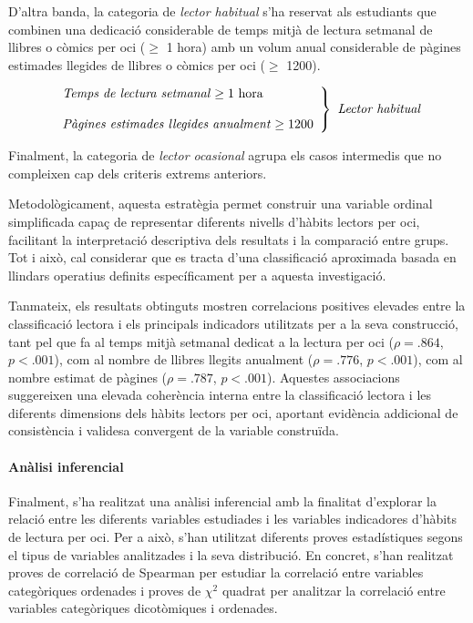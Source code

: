 \documentclass[12pt]{article}
\begin{document}
D'altra banda, la categoria de \emph{lector habitual} s’ha reservat als estudiants que combinen una dedicació considerable de temps mitjà de lectura setmanal de llibres o còmics per oci ($\geq$ 1 hora) amb un volum anual considerable de pàgines estimades llegides de llibres o còmics per oci ($\geq$ 1200).

\[
\left.
\begin{array}{l}
\text{\emph{Temps de lectura setmanal}} \geq 1 \text{ hora} \\\\
\text{\emph{Pàgines estimades llegides anualment}} \geq 1200
\end{array}
\right\}
\textit{ Lector habitual}
\]

Finalment, la categoria de \emph{lector ocasional} agrupa els casos intermedis que no compleixen cap dels criteris extrems anteriors.

Metodològicament, aquesta estratègia permet construir una variable ordinal simplificada capaç de representar diferents nivells d’hàbits lectors per oci, facilitant la interpretació descriptiva dels resultats i la comparació entre grups. Tot i això, cal considerar que es tracta d’una classificació aproximada basada en llindars operatius definits específicament per a aquesta investigació.

Tanmateix, els resultats obtinguts mostren correlacions positives elevades entre la classificació lectora i els principals indicadors utilitzats per a la seva construcció, tant pel que fa al temps mitjà setmanal dedicat a la lectura per oci ($\rho = .864$, $p < .001$), com al nombre de llibres llegits anualment ($\rho = .776$, $p < .001$), com al nombre estimat de pàgines ($\rho = .787$, $p < .001$). Aquestes associacions suggereixen una elevada coherència interna entre la classificació lectora i les diferents dimensions dels hàbits lectors per oci, aportant evidència addicional de consistència i validesa convergent de la variable construïda.

\paragraph{Anàlisi inferencial}

Finalment, s'ha realitzat una anàlisi inferencial amb la finalitat d’explorar la relació entre les diferents variables estudiades i les variables indicadores d'hàbits de lectura per oci. Per a això, s'han utilitzat diferents proves estadístiques segons el tipus de variables analitzades i la seva distribució. En concret, s'han realitzat proves de correlació de Spearman per estudiar la correlació entre variables categòriques ordenades i proves de $\chi^2$ quadrat per analitzar la correlació entre variables categòriques dicotòmiques i ordenades.
\end{document}
